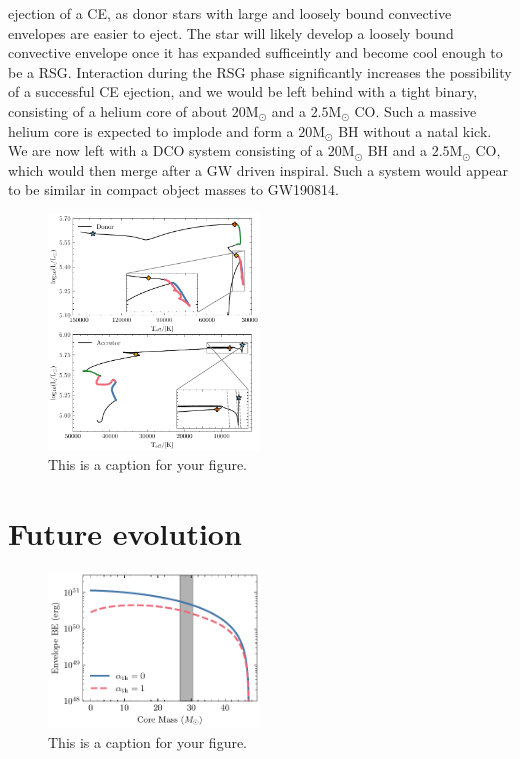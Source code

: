 \documentclass[linenumbers,trackchanges,twocolumn]{aastex701}
\newcommand{\Mdot}{\mathrm{M}_{\odot}}
\begin{document}
ejection of a CE, as donor stars with large and loosely bound convective envelopes are easier to eject. The star will likely develop a loosely bound convective envelope once it has expanded sufficeintly and become cool enough to be a RSG. Interaction during the RSG phase significantly increases the possibility of a successful CE ejection, and we would be left behind with a tight binary, consisting of a helium core of about $20\Mdot$ and a $2.5\Mdot$ CO. Such a massive helium core is expected to implode and form a $20\Mdot$ BH without a natal kick. We are now left with a DCO system consisting of a $20\Mdot$ BH and a $2.5\Mdot$ CO, which would then merge after a GW driven inspiral. Such a system would appear to be similar in compact object masses to GW190814. 

\begin{figure}[htbp]
    \centering
    \includegraphics[width=0.5\textwidth]{gw_fiducial_hr.pdf}
    \caption{This is a caption for your figure.}
    \label{fig:gw_hr}
\end{figure}

\section{Future evolution}

\begin{figure}[htbp]
    \centering
    \includegraphics[width=0.5\textwidth]{xrb_be.pdf}
    \caption{This is a caption for your figure.}
    \label{fig:xrb_be}
\end{figure}
\end{document}
